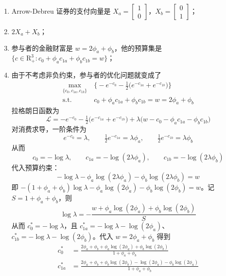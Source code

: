 \begin{solution}
\begin{enumerate}[label=(\alph*)]
    \item Arrow-Debreu 证券的支付向量是 $X_{a}=\begin{bmatrix}1 \\ 0\end{bmatrix}$，$X_{b}=\begin{bmatrix}0 \\ 1\end{bmatrix}$；
    \item $2X_{a}+X_{b}$；
    \item 参与者的金融财富是 $w=2\phi_{a}+\phi_{b}$，他的预算集是 $\{c\in\mathrm{R}_{+}^{3}:c_{0}+\phi_{a}c_{1a}+\phi_{b}c_{1b}=w\}$；
    \item 由于不考虑非负约束，参与者的优化问题就变成了
    \[
        \begin{aligned}
            \max_{\{c_{0},c_{1a},c_{1b}\}}\ &\bigl\{-e^{-c_{0}}-\tfrac12\bigl(e^{-c_{1a}}+e^{-c_{1b}}\bigr)\bigr\}\\
            \mathrm{s.t.}\quad &c_{0}+\phi_{a}c_{1a}+\phi_{b}c_{1b}=w=2\phi_{a}+\phi_{b}
        \end{aligned}
    \]
    拉格朗日函数为
    \[
        \mathcal{L}=-e^{-c_{0}}-\tfrac12\bigl(e^{-c_{1a}}+e^{-c_{1b}}\bigr)+\lambda\bigl(w-c_{0}-\phi_{a}c_{1a}-\phi_{b}c_{1b}\bigr)
    \]
    对消费求导，一阶条件为
    \[
        e^{-c_{0}}=\lambda,\qquad
        \tfrac12 e^{-c_{1a}}=\lambda\phi_{a},\qquad
        \tfrac12 e^{-c_{1b}}=\lambda\phi_{b}
    \]
    从而
    \[
        c_{0}=-\log\lambda,\qquad
        c_{1a}=-\log(2\lambda\phi_{a}),\qquad
        c_{1b}=-\log(2\lambda\phi_{b})
    \]
    代入预算约束：
    \[
        -\log\lambda-\phi_{a}\log(2\lambda\phi_{a})-\phi_{b}\log(2\lambda\phi_{b})=w
    \]
    即 $-(1+\phi_{a}+\phi_{b})\log\lambda-\phi_{a}\log(2\phi_{a})-\phi_{b}\log(2\phi_{b})=w$。记 $S=1+\phi_{a}+\phi_{b}$，则
    \[
        \log\lambda=-\frac{w+\phi_{a}\log(2\phi_{a})+\phi_{b}\log(2\phi_{b})}{S}
    \]
    从而 $c_{0}^{*}=-\log\lambda$，且 $c_{1a}^{*}=-\log\lambda-\log(2\phi_{a})$、$c_{1b}^{*}=-\log\lambda-\log(2\phi_{b})$。代入 $w=2\phi_{a}+\phi_{b}$ 得到
    \[
        \begin{aligned}
            c_{0}^{*}&=\frac{2\phi_{a}+\phi_{b}+\phi_{a}\log(2\phi_{a})+\phi_{b}\log(2\phi_{b})}{1+\phi_{a}+\phi_{b}}\\
            c_{1a}^{*}&=\frac{2\phi_{a}+\phi_{b}+\phi_{b}\log(2\phi_{b})-\log(2\phi_{a})-\phi_{b}\log(2\phi_{a})}{1+\phi_{a}+\phi_{b}}\\

\end{aligned}\]
\end{enumerate}
\end{solution}
